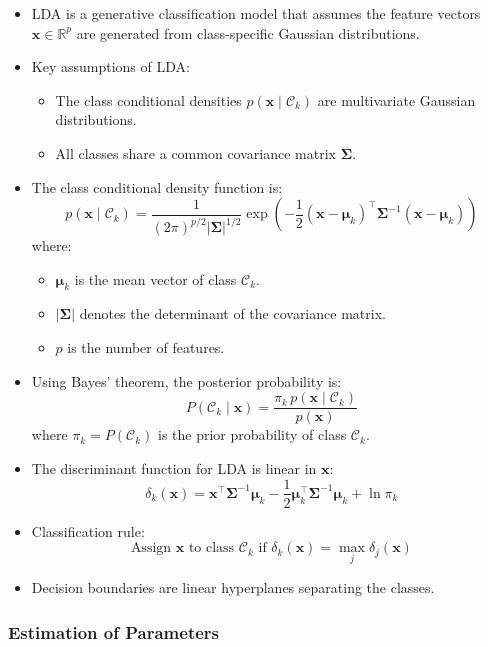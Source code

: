 \documentclass{article}
\begin{document}
\begin{itemize}
  \item LDA is a generative classification model that assumes the feature vectors $\mathbf{x} \in \mathbb{R}^p$ are generated from class-specific Gaussian distributions.
  \item Key assumptions of LDA:
  \begin{itemize}
    \item The class conditional densities $p(\mathbf{x} \mid \mathcal{C}_k)$ are multivariate Gaussian distributions.
    \item All classes share a common covariance matrix $\boldsymbol{\Sigma}$.
  \end{itemize}
  \item The class conditional density function is:
  \[
  p(\mathbf{x} \mid \mathcal{C}_k) = \frac{1}{(2\pi)^{p/2} |\boldsymbol{\Sigma}|^{1/2}} \exp\left( -\frac{1}{2} (\mathbf{x} - \boldsymbol{\mu}_k)^\top \boldsymbol{\Sigma}^{-1} (\mathbf{x} - \boldsymbol{\mu}_k) \right)
  \]
  where:
  \begin{itemize}
    \item $\boldsymbol{\mu}_k$ is the mean vector of class $\mathcal{C}_k$.
    \item $|\boldsymbol{\Sigma}|$ denotes the determinant of the covariance matrix.
    \item $p$ is the number of features.
  \end{itemize}
  \item Using Bayes' theorem, the posterior probability is:
  \[
  P(\mathcal{C}_k \mid \mathbf{x}) = \frac{\pi_k \, p(\mathbf{x} \mid \mathcal{C}_k)}{p(\mathbf{x})}
  \]
  where $\pi_k = P(\mathcal{C}_k)$ is the prior probability of class $\mathcal{C}_k$.
  \item The discriminant function for LDA is linear in $\mathbf{x}$:
  \[
  \delta_k(\mathbf{x}) = \mathbf{x}^\top \boldsymbol{\Sigma}^{-1} \boldsymbol{\mu}_k - \frac{1}{2} \boldsymbol{\mu}_k^\top \boldsymbol{\Sigma}^{-1} \boldsymbol{\mu}_k + \ln \pi_k
  \]
  \item Classification rule:
  \[
  \text{Assign } \mathbf{x} \text{ to class } \mathcal{C}_k \text{ if } \delta_k(\mathbf{x}) = \max_{j} \delta_j(\mathbf{x})
  \]
  \item Decision boundaries are linear hyperplanes separating the classes.
\end{itemize}

\subsubsection{Estimation of Parameters}
\end{document}

